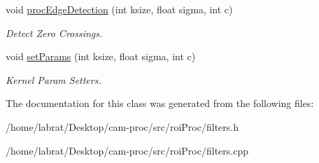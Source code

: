 \begin{DoxyCompactItemize}
\item 
void \hyperlink{classFilters_af92c67a7f21ffdff4b22eac19547fd45}{proc\+Edge\+Detection} (int ksize, float sigma, int c)\hypertarget{classFilters_af92c67a7f21ffdff4b22eac19547fd45}{}\label{classFilters_af92c67a7f21ffdff4b22eac19547fd45}

\begin{DoxyCompactList}\small\item\em Detect Zero Crossings. \end{DoxyCompactList}\item 
void \hyperlink{classFilters_aaa048935a8173b4b3d9d1b48167e9850}{set\+Params} (int ksize, float sigma, int c)\hypertarget{classFilters_aaa048935a8173b4b3d9d1b48167e9850}{}\label{classFilters_aaa048935a8173b4b3d9d1b48167e9850}

\begin{DoxyCompactList}\small\item\em Kernel Param Setters. \end{DoxyCompactList}\end{DoxyCompactItemize}


The documentation for this class was generated from the following files\+:\begin{DoxyCompactItemize}
\item 
/home/labrat/\+Desktop/cam-\/proc/src/roi\+Proc/filters.\+h\item 
/home/labrat/\+Desktop/cam-\/proc/src/roi\+Proc/filters.\+cpp\end{DoxyCompactItemize}
